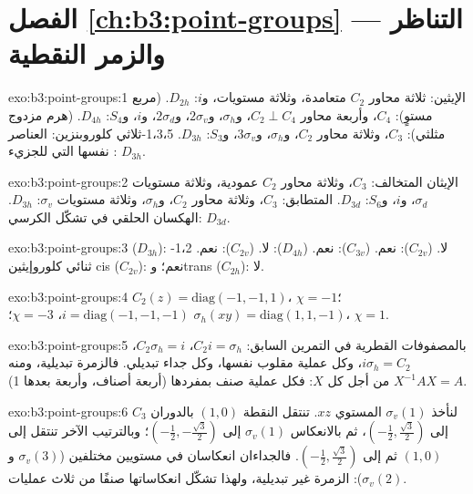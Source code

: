 \section*{الفصل \ref{ch:b3:point-groups} --- التناظر والزمر النقطية}

\begin{solution}{exo:b3:point-groups:1}
الإيثين: ثلاثة محاور $C_2$ متعامدة، وثلاثة مستويات، و$i$: $D_{2h}$.  (مربع
مستوٍ): $C_4$، وأربعة محاور $C_2 \perp C_4$، و$\sigma_h$، و$2\sigma_v$، و$2\sigma_d$، و$i$، و$S_4$:
$D_{4h}$.  (هرم مزدوج مثلثي): $C_3$، وثلاثة محاور $C_2$، و$\sigma_h$، و$3\sigma_v$،
و$S_3$: $D_{3h}$. 1،3،5-ثلاثي كلوروبنزين: العناصر نفسها التي للجزيء : $D_{3h}$.
\end{solution}

\begin{solution}{exo:b3:point-groups:2}
الإيثان المتخالف: $C_3$، وثلاثة محاور $C_2$ عمودية، وثلاثة مستويات $\sigma_d$، و$i$، و$S_6$:
$D_{3d}$. المتطابق: $C_3$، وثلاثة محاور $C_2$، و$\sigma_h$، وثلاثة مستويات $\sigma_v$: $D_{3h}$.
الهكسان الحلقي في تشكّل الكرسي: $D_{3d}$.
\end{solution}

\begin{solution}{exo:b3:point-groups:3}
 ($D_{3h}$): لا.  ($C_{2v}$): نعم.  ($C_{3v}$): نعم.
 ($D_{4h}$): لا.  ($C_{2v}$): نعم. 1،2-ثنائي كلوروإيثين cis
($C_{2v}$): نعم؛ وtrans ($C_{2h}$): لا.
\end{solution}

\begin{solution}{exo:b3:point-groups:4}
$C_2(z) = \mathrm{diag}(-1,-1,1)$، $\chi = -1$؛ $i = \mathrm{diag}(-1,-1,-1)$،
$\chi = -3$؛ $\sigma_h(xy) = \mathrm{diag}(1,1,-1)$، $\chi = 1$.
\end{solution}

\begin{solution}{exo:b3:point-groups:5}
بالمصفوفات القطرية في التمرين السابق: $C_2i = \sigma_h$، $C_2\sigma_h =
i$، $i\sigma_h = C_2$، وكل عملية مقلوب نفسها، وكل جداء
تبديلي. فالزمرة تبديلية، ومنه $X^{-1}AX = A$ من أجل كل $X$: فكل
عملية صنف بمفردها (أربعة أصناف، وأربعة 
بعدها 1).
\end{solution}

\begin{solution}{exo:b3:point-groups:6}
لنأخذ $\sigma_v(1)$ المستوي $xz$. تنتقل النقطة $(1,0)$ بالدوران $C_3$ إلى $(-\frac12,
\frac{\sqrt3}2)$، ثم بالانعكاس $\sigma_v(1)$ إلى $(-\frac12,-\frac{\sqrt3}2)$؛ وبالترتيب
الآخر تنتقل إلى $(1,0)$ ثم إلى $(-\frac12,\frac{\sqrt3}2)$. فالجداءان
انعكاسان في مستويين مختلفين ($\sigma_v(3)$ و$\sigma_v(2)$): الزمرة
غير تبديلية، ولهذا تشكّل انعكاساتها صنفًا من ثلاث عمليات.
\end{solution}

